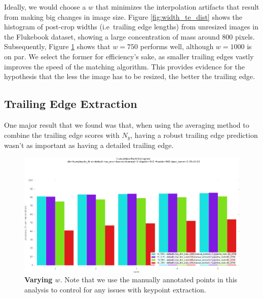


Ideally, we would choose a $w$ that minimizes the interpolation artifacts that result from making big changes in image size.
Figure \ref{fig:width_te_dist} shows the histogram of post-crop widths (i.e\ trailing edge lengths) from unresized images in the Flukebook dataset, showing a large concentration of mass around 800 pixels. 
Subsequently, Figure \ref{fig:vary_crop_size} shows that $w = 750$ performs well, although $w = 1000$ is on par.
We select the former for efficiency's sake, as smaller trailing edges vastly improves the speed of the matching algorithm.
This provides evidence for the hypothesis that the less the image has to be resized, the better the trailing edge.

\subsection{Trailing Edge Extraction}

One major result that we found was that, when using the averaging method to combine the trailing edge scores with $N_y$, having a robust trailing edge prediction wasn't as important as having a detailed trailing edge.

\begin{figure}[t]%
\centering
\includegraphics[width=1\textwidth]{../images/results/vary_crop_size.png}
\caption{\textbf{Varying $w$}. Note that we use the manually annotated points in this analysis to control for any issues with keypoint extraction.}
\label{fig:vary_crop_size}
\end{figure}


